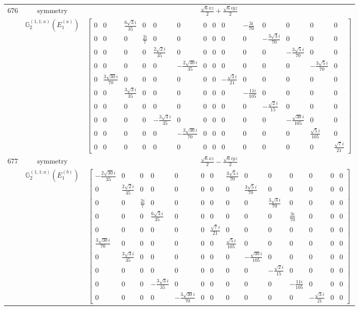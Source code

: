 \documentclass[fleqn,8pt,landscape]{jsarticle}
\begin{document}
\begin{longtable}{ccc}
$ 676 $ & $ \text{symmetry} $ & $ \frac{\sqrt{6} x z}{2} + \frac{\sqrt{6} i y z}{2} $ \\
$  $ & $ \mathbb{G}_{2}^{(1,1;a)}(E_{1}^{(a)}) $ & $ \begin{bmatrix} 0 & 0 & \frac{6 \sqrt{3} i}{35} & 0 & 0 & 0 & 0 & 0 & 0 & - \frac{3 i}{70} & 0 & 0 & 0 & 0 \\ 0 & 0 & 0 & \frac{2 i}{7} & 0 & 0 & 0 & 0 & 0 & 0 & - \frac{3 \sqrt{3} i}{70} & 0 & 0 & 0 \\ 0 & 0 & 0 & 0 & \frac{2 \sqrt{2} i}{35} & 0 & 0 & 0 & 0 & 0 & 0 & - \frac{3 \sqrt{5} i}{70} & 0 & 0 \\ 0 & 0 & 0 & 0 & 0 & - \frac{2 \sqrt{30} i}{35} & 0 & 0 & 0 & 0 & 0 & 0 & - \frac{3 \sqrt{5} i}{70} & 0 \\ 0 & \frac{3 \sqrt{30} i}{70} & 0 & 0 & 0 & 0 & 0 & 0 & - \frac{\sqrt{3} i}{21} & 0 & 0 & 0 & 0 & 0 \\ 0 & 0 & \frac{3 \sqrt{3} i}{35} & 0 & 0 & 0 & 0 & 0 & 0 & - \frac{11 i}{105} & 0 & 0 & 0 & 0 \\ 0 & 0 & 0 & 0 & 0 & 0 & 0 & 0 & 0 & 0 & - \frac{\sqrt{2} i}{15} & 0 & 0 & 0 \\ 0 & 0 & 0 & 0 & - \frac{3 \sqrt{3} i}{35} & 0 & 0 & 0 & 0 & 0 & 0 & - \frac{\sqrt{30} i}{105} & 0 & 0 \\ 0 & 0 & 0 & 0 & 0 & - \frac{3 \sqrt{30} i}{70} & 0 & 0 & 0 & 0 & 0 & 0 & \frac{\sqrt{5} i}{105} & 0 \\ 0 & 0 & 0 & 0 & 0 & 0 & 0 & 0 & 0 & 0 & 0 & 0 & 0 & \frac{\sqrt{7} i}{21} \end{bmatrix} $ \\ \hline
$ 677 $ & $ \text{symmetry} $ & $ \frac{\sqrt{6} x z}{2} - \frac{\sqrt{6} i y z}{2} $ \\
$  $ & $ \mathbb{G}_{2}^{(1,1;a)}(E_{1}^{(b)}) $ & $ \begin{bmatrix} - \frac{2 \sqrt{30} i}{35} & 0 & 0 & 0 & 0 & 0 & 0 & \frac{3 \sqrt{5} i}{70} & 0 & 0 & 0 & 0 & 0 & 0 \\ 0 & \frac{2 \sqrt{2} i}{35} & 0 & 0 & 0 & 0 & 0 & 0 & \frac{3 \sqrt{5} i}{70} & 0 & 0 & 0 & 0 & 0 \\ 0 & 0 & \frac{2 i}{7} & 0 & 0 & 0 & 0 & 0 & 0 & \frac{3 \sqrt{3} i}{70} & 0 & 0 & 0 & 0 \\ 0 & 0 & 0 & \frac{6 \sqrt{3} i}{35} & 0 & 0 & 0 & 0 & 0 & 0 & \frac{3 i}{70} & 0 & 0 & 0 \\ 0 & 0 & 0 & 0 & 0 & 0 & \frac{\sqrt{7} i}{21} & 0 & 0 & 0 & 0 & 0 & 0 & 0 \\ \frac{3 \sqrt{30} i}{70} & 0 & 0 & 0 & 0 & 0 & 0 & \frac{\sqrt{5} i}{105} & 0 & 0 & 0 & 0 & 0 & 0 \\ 0 & \frac{3 \sqrt{3} i}{35} & 0 & 0 & 0 & 0 & 0 & 0 & - \frac{\sqrt{30} i}{105} & 0 & 0 & 0 & 0 & 0 \\ 0 & 0 & 0 & 0 & 0 & 0 & 0 & 0 & 0 & - \frac{\sqrt{2} i}{15} & 0 & 0 & 0 & 0 \\ 0 & 0 & 0 & - \frac{3 \sqrt{3} i}{35} & 0 & 0 & 0 & 0 & 0 & 0 & - \frac{11 i}{105} & 0 & 0 & 0 \\ 0 & 0 & 0 & 0 & - \frac{3 \sqrt{30} i}{70} & 0 & 0 & 0 & 0 & 0 & 0 & - \frac{\sqrt{3} i}{21} & 0 & 0 \end{bmatrix} $ \\ \hline

\end{longtable}
\end{document}
